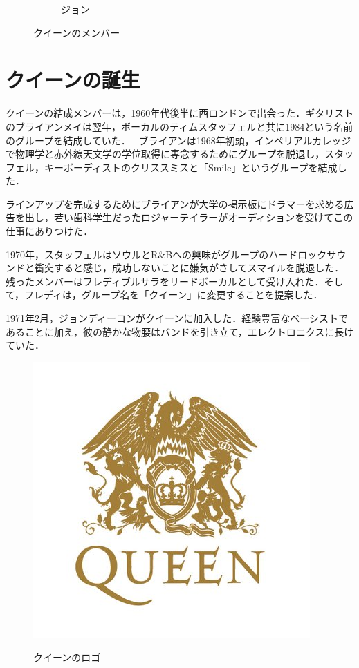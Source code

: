 \documentclass[a4j, twocolumn]{jarticle}
\begin{document}
\begin{figure}[htb]
\begin{subfigure}[b]{0.15\textwidth}
    \vspace{-1.0mm}
    \caption{ジョン}
    \label{johnimg}
  \end{subfigure}
      \vspace{-3.0mm}
      \caption{クイーンのメンバー}
     \label{jpnimg}
\end{figure}

\section{クイーンの誕生}

クイーンの結成メンバーは，1960年代後半に西ロンドンで出会った．ギタリストのブライアンメイは翌年，ボーカルのティムスタッフェルと共に1984という名前のグループを結成していた．\cite{Blake}~ ブライアンは1968年初頭，インペリアルカレッジで物理学と赤外線天文学の学位取得に専念するためにグループを脱退し，スタッフェル，キーボーディストのクリススミスと「Smile」というグループを結成した．\cite{Blake}

ラインアップを完成するためにブライアンが大学の掲示板にドラマーを求める広告を出し，若い歯科学生だったロジャーテイラーがオーディションを受けてこの仕事にありつけた．\cite{Hodkinson}

1970年，スタッフェルはソウルとR\&Bへの興味がグループのハードロックサウンドと衝突すると感じ，成功しないことに嫌気がさしてスマイルを脱退した．\cite{Blake} 残ったメンバーはフレディブルサラをリードボーカルとして受け入れた．そして，フレディは，グループ名を「クイーン」に変更することを提案した．

1971年2月，ジョンディーコンがクイーンに加入した．経験豊富なベーシストであることに加え，彼の静かな物腰はバンドを引き立て，エレクトロニクスに長けていた．\cite{Blake}

\begin{figure}[htb]
  \begin{center}
      \includegraphics[scale=0.3]{Queen.jpg}
      \caption{クイーンのロゴ}
      \vspace{-15pt}
      \label{Queen_Image}
  \end{center}
\end{figure}
\end{document}
